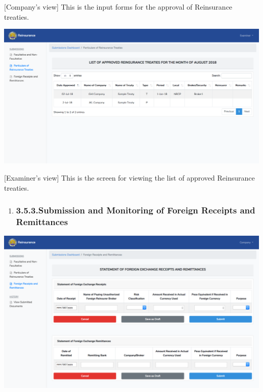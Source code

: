 \documentclass{article}
\begin{document}
[Company’s view] This is the input forms for the
approval of Reinsurance treaties.%

\includegraphics[keepaspectratio=true]{up-ic-screens/image154}{}%

[Examiner’s view] This is the screen for viewing the
list of approved Reinsurance treaties.%

\begin{enumerate}[noitemsep,topsep=\mdcompacttopsep]%

\item{}
\subsubsection{3.5.3.\hspace*{0.5em}Submission and Monitoring of Foreign Receipts and Remittances}\label{sec-submission-and-monitoring-of-foreign-receipts-and-remittances}%
\end{enumerate}%

\noindent{}\includegraphics[keepaspectratio=true]{up-ic-screens/image133}{}%
\end{document}
